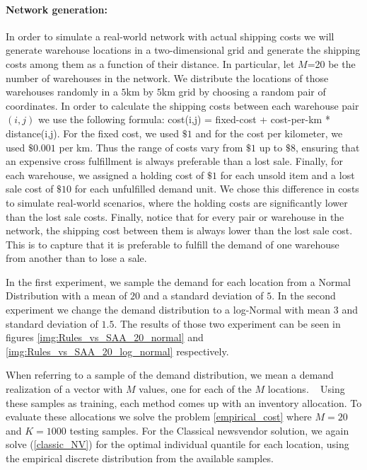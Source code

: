 \documentclass[poms,final,blindrev]{poms1_V1} %
\begin{document}
\paragraph{Network generation:} In order to simulate a real-world network with actual shipping costs we will generate warehouse locations in a two-dimensional grid and generate the shipping costs among them as a function of their distance.
In particular, let $M$=20 be the number of warehouses in the network. We distribute the locations of those warehouses randomly in a $5$km by $5$km grid by choosing a random pair of coordinates. In order to calculate the shipping costs between each warehouse pair $(i,j)$ we use the following formula: cost(i,j) = fixed-cost + cost-per-km * distance(i,j). For the fixed cost, we used $\$1$ and for the cost per kilometer, we used $\$0.001$ per km. Thus the range of costs vary from $\$1$ up to $\$8$, ensuring that an expensive cross fulfillment is always preferable than a lost sale.
Finally, for each warehouse, we assigned a holding cost of $\$1$ for each unsold item and a lost sale cost of $\$10$ for each unfulfilled demand unit. We chose this difference in costs to simulate real-world scenarios, where the holding costs are significantly lower than the lost sale costs. Finally, notice that for every pair or warehouse in the network, the shipping cost between them is always lower than the lost sale cost. This is to capture that it is preferable to fulfill the demand of one warehouse from another than to lose a sale.

In the first experiment, we sample the demand for each location from a Normal Distribution with a mean of $20$ and a standard deviation of $5$.
In the second experiment we change the demand distribution to a log-Normal with mean $3$ and standard deviation of $1.5$. The results of those two experiment can be seen in figures \ref{img:Rules_vs_SAA_20_normal} and \ref{img:Rules_vs_SAA_20_log_normal} respectively.

When referring to a sample of the demand distribution, we mean a demand realization of a vector with $M$ values, one for each of the $M$ locations.  
Using these samples as training, each method comes up with an inventory allocation. To evaluate these allocations we solve the problem \ref{empirical_cost} where $M=20$ and $K=1000$ testing samples.
For the Classical newsvendor solution, we again solve (\ref{classic_NV}) for the optimal individual quantile for each location, using the empirical discrete distribution from the available samples.
\end{document}
